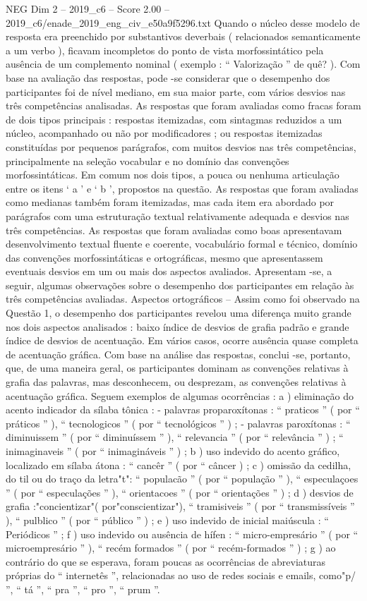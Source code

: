 \begin{textsample}{NEG Dim 2 – 2019\_c6 – Score 2.00 – 2019\_c6/enade\_2019\_eng\_civ\_e50a9f5296.txt}
Quando o núcleo desse modelo de resposta era preenchido por substantivos deverbais ( relacionados semanticamente a um verbo ), ficavam incompletos do ponto de vista morfossintático pela ausência de um complemento nominal ( exemplo : “ Valorização ” de quê? ).
Com base na avaliação das respostas, pode -se considerar que o desempenho dos participantes foi de nível mediano, em sua maior parte, com vários desvios nas três competências analisadas.
As respostas que foram avaliadas como fracas foram de dois tipos principais : respostas itemizadas, com sintagmas reduzidos a um núcleo, acompanhado ou não por modificadores ; ou respostas itemizadas constituídas por pequenos parágrafos, com muitos desvios nas três competências, principalmente na seleção vocabular e no domínio das convenções morfossintáticas.
Em comum nos dois tipos, a pouca ou nenhuma articulação entre os itens ‘ a ’ e ‘ b ’, propostos na questão.
As respostas que foram avaliadas como medianas também foram itemizadas, mas cada item era abordado por parágrafos com uma estruturação textual relativamente adequada e desvios nas três competências.
As respostas que foram avaliadas como boas apresentavam desenvolvimento textual fluente e coerente, vocabulário formal e técnico, domínio das convenções morfossintáticas e ortográficas, mesmo que apresentassem eventuais desvios em um ou mais dos aspectos avaliados.
Apresentam -se, a seguir, algumas observações sobre o desempenho dos participantes em relação às três competências avaliadas.
Aspectos ortográficos – Assim como foi observado na Questão 1, o desempenho dos participantes revelou uma diferença muito grande nos dois aspectos analisados : baixo índice de desvios de grafia padrão e grande índice de desvios de acentuação.
Em vários casos, ocorre ausência quase completa de acentuação gráfica.
Com base na análise das respostas, conclui -se, portanto, que, de uma maneira geral, os participantes dominam as convenções relativas à grafia das palavras, mas desconhecem, ou desprezam, as convenções relativas à acentuação gráfica.
Seguem exemplos de algumas ocorrências : a ) eliminação do acento indicador da sílaba tônica : - palavras proparoxítonas : “ praticos ” ( por “ práticos ” ), “ tecnologicos ” ( por “ tecnológicos ” ) ; - palavras paroxítonas : “ diminuissem ” ( por “ diminuíssem ” ), “ relevancia ” ( por “ relevância ” ) ; “ inimaginaveis ” ( por “ inimagináveis ” ) ; b ) uso indevido do acento gráfico, localizado em sílaba átona : “ cancêr ” ( por “ câncer ) ; c ) omissão da cedilha, do til ou do traço da letra"t": “ populacão ” ( por “ população ” ), “ especulaçoes ” ( por “ especulações ” ), “ orientacoes ” ( por “ orientações ” ) ; d ) desvios de grafia :"concientizar"( por"conscientizar"), “ tramisiveis ” ( por “ transmissíveis ” ), “ pulblico ” ( por “ público ” ) ; e ) uso indevido de inicial maiúscula : “ Periódicos ” ; f ) uso indevido ou ausência de hífen : “ micro-empresário ” ( por “ microempresário ” ), “ recém formados ” ( por “ recém-formados ” ) ; g ) ao contrário do que se esperava, foram poucas as ocorrências de abreviaturas próprias do “ internetês ”, relacionadas ao uso de redes sociais e emails, como"p/ ”, “ tá ”, “ pra ”, “ pro ”, “ prum ”.

\end{textsample}
